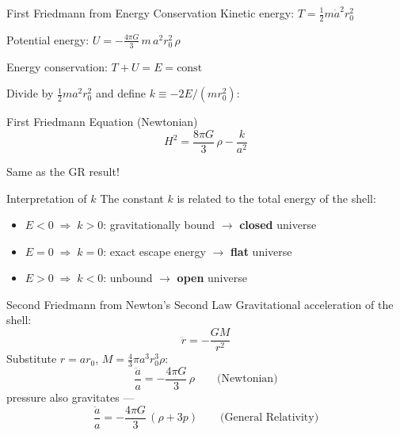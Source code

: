 \documentclass[aspectratio=169,11pt]{beamer}
\begin{document}
\begin{frame}{First Friedmann from Energy Conservation}
Kinetic energy: $T = \frac{1}{2}m\dot{a}^2r_0^2$

Potential energy: $U = -\frac{4\pi G}{3}\,m\,a^2r_0^2\,\rho$

\vspace{0.2cm}
Energy conservation: $T+U=E=\text{const}$

\vspace{0.2cm}
Divide by $\frac{1}{2}ma^2r_0^2$ and define $k\equiv-2E/(mr_0^2)$:

\begin{alertblock}{First Friedmann Equation (Newtonian)}
\begin{equation*}
    H^2 = \frac{8\pi G}{3}\,\rho - \frac{k}{a^2}
\end{equation*}
\end{alertblock}
\alert{Same as the GR result!}
\end{frame}

\begin{frame}{Interpretation of $k$}
The constant $k$ is related to the total energy of the shell:
\vspace{0.3cm}
\begin{itemize}
    \item<1-> $E<0\;\Rightarrow\;k>0$: gravitationally bound $\longrightarrow$ \textbf{closed} universe
    \item<2-> $E=0\;\Rightarrow\;k=0$: exact escape energy $\longrightarrow$ \textbf{flat} universe
    \item<3-> $E>0\;\Rightarrow\;k<0$: unbound $\longrightarrow$ \textbf{open} universe
\end{itemize}
\vspace{0.5cm}
\end{frame}

\begin{frame}{Second Friedmann from Newton's Second Law}
Gravitational acceleration of the shell:
\begin{equation*}
    \ddot{r} = -\frac{GM}{r^2}
\end{equation*}
Substitute $r=ar_0$, $M=\tfrac{4}{3}\pi a^3 r_0^3\rho$:
\begin{equation*}
    \frac{\ddot{a}}{a} = -\frac{4\pi G}{3}\,\rho
    \qquad\text{(Newtonian)}
\end{equation*}
\vspace{0.3cm}
 pressure also gravitates ---
\begin{equation*}
    \frac{\ddot{a}}{a} = -\frac{4\pi G}{3}\,(\rho+3p)
    \qquad\text{(General Relativity)}
\end{equation*}
\end{frame}
\end{document}

